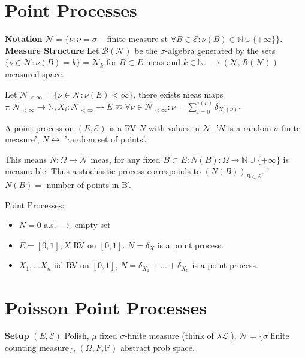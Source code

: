 \section{Point Processes}
\textbf{Notation} $\mathcal{N}=\{\nu: \nu=\sigma-$finite measure st $\forall B \in \mathcal{E}: \nu(B) \in \mathbb{N} \cup \{+\infty\}\}$.
\noindent
\textbf{Measure Structure} Let $\mathcal{B}(\mathcal{N})$ be the $\sigma$-algebra generated by the sets $\{\nu \in \mathcal{N}: \nu(B)=k\}=\mathcal{N}_k$ for $B \subset E$ meas and $k \in \mathbb{N}$. $\to (\mathcal{N}, \mathcal{B}(\mathcal{N}))$ measured space.

\begin{prop}[]
	Let $\mathcal{N}_{<\infty}=\{\nu \in \mathcal{N}: \nu(E)<\infty \}$, there exists meas maps $\tau: \mathcal{N}_{< \infty} \to \mathbb{N}, X_i: \mathcal{N}_{< \infty} \to E$ st $\forall \nu \in \mathcal{N}_{<\infty}: \nu = \sum_{i=0}^{\tau(\nu)} \delta_{X_i(\nu)}$.
\end{prop}

\begin{defn}
	A point process on $(E, \mathcal{E})$ is a RV $N$ with values in $ \mathcal{N}$. '$N$ is a random $\sigma$-finite measure', $N \leftrightarrow$ 'random set of points'. 
\end{defn}
This means $N: \Omega \to \mathcal{N} $ meas, for any fixed $B \subset E: N(B): \Omega \to \mathbb{N}\cup \{+\infty\}$ is measurable. 
Thus a stochastic process corresponds to $(N(B))_{B \in \mathcal{E}}$. '$N(B)=$ number of points in B'.

\begin{ex}[] Point Processes:
\begin{itemize}
	\item $N=0$ a.s.  $\to$ empty set
	\item $E=[0,1], X$ RV on  $[0,1]$.  $N=\delta_X$ is a point process.
	\item $X_1,...X_n$ iid RV on $[0,1]$,  $N=\delta_{X_1}+...+\delta_{X_n}$ is a point process.
\end{itemize}
\end{ex}

\section{Poisson Point Processes}
\textbf{Setup} $(E, \mathcal{E})$ Polish, $\mu$ fixed $\sigma$-finite measure (think of $\lambda \mathcal{L}$ ), $ \mathcal{N}=\{\sigma$ finite counting measure$\}$, $(\Omega, F, \mathbb{P} )$ abstract prob space.

